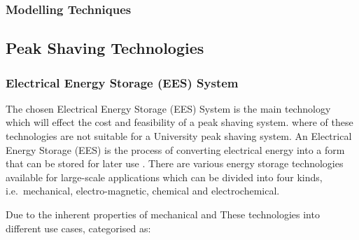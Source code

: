 \subsubsection{Modelling Techniques}\label{modelling-techniques}

\subsection{Peak Shaving Technologies}\label{peak-shaving-technologies}

\subsubsection{Electrical Energy Storage (EES)
System}\label{electrical-energy-storage-ees-system}

The chosen Electrical Energy Storage (EES) System is the main technology
which will effect the cost and feasibility of a peak shaving system.
where of these technologies are not suitable for a University peak
shaving system. An Electrical Energy Storage (EES) is the process of
converting electrical energy into a form that can be stored for later
use \cite{Chen2009291}. There are various energy storage technologies
available for large-scale applications which can be divided into four
kinds, i.e.~mechanical, electro-magnetic, chemical and electrochemical.

Due to the inherent properties of mechanical and These technologies into
different use cases, categorised as:


